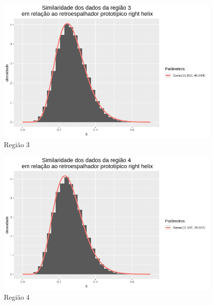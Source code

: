 \documentclass[12pt]{article}
\begin{document}
\begin{figure}[!h]
    \centering
    \vspace{0.1\linewidth}
    \includegraphics[width = \linewidth]{../../Images/Report_18_12_20/rh_region3.png}
    \caption{Região 3}
    \label{fig:rh_r3}
\end{figure}

\begin{figure}[!h]
    \centering
    \vspace{0.1\linewidth}
    \includegraphics[width = \linewidth]{../../Images/Report_18_12_20/rh_region4.png}
    \caption{Região 4}
    \label{fig:rh_r4}
\end{figure}
\end{document}

